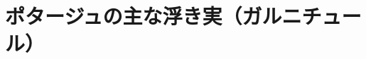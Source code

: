 \href{原稿下準備20180414五島、連載からコピー}{} \href{訳と注釈}{}
\href{未、原文対照チェック}{} \href{未、日本語表現校正}{}
\href{未、その他修正}{} \href{未、原稿最終校正}{}

\hypertarget{ux30ddux30bfux30fcux30b8ux30e5ux306eux4e3bux306aux6d6eux304dux5b9fux30acux30ebux30cbux30c1ux30e5ux30fcux30eb}{%
\section{ポタージュの主な浮き実（ガルニチュール）}\label{ux30ddux30bfux30fcux30b8ux30e5ux306eux4e3bux306aux6d6eux304dux5b9fux30acux30ebux30cbux30c1ux30e5ux30fcux30eb}}


